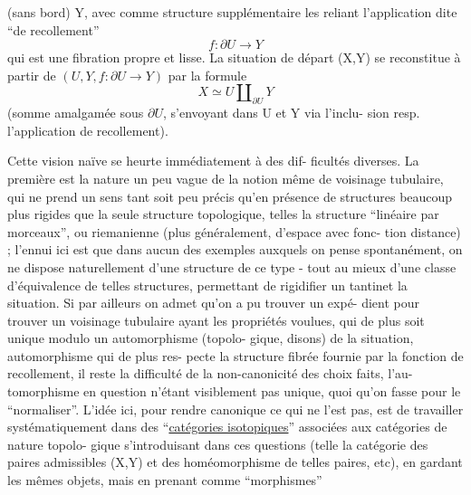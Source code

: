 
(sans bord)  Y, avec comme structure supplémentaire les reliant
l'application dite ``de recollement''
\[ f : \partial U \longrightarrow Y \]
qui est une fibration propre et lisse. La situation de départ
(X,Y)  se reconstitue à partir de  $(U,Y, f : \partial U \longrightarrow Y)$  par la
formule
\[ X \simeq U \amalg_{\partial U} Y \]
(somme amalgamée sous  $\partial U$, s'envoyant dans  U  et  Y  via l'inclu-%
sion resp. l'application de recollement).

Cette vision naïve se heurte immédiatement à des dif-%
ficultés diverses. La première est la nature un peu vague de la
notion même de voisinage tubulaire, qui ne prend un sens tant soit
peu précis qu'en présence de structures beaucoup plus rigides que
la seule structure topologique, telles la structure ``linéaire par
morceaux'', ou riemanienne (plus généralement, d'espace avec fonc-%
tion distance) ; l'ennui ici est que dans aucun des exemples
auxquels on pense spontanément, on ne dispose naturellement d'une
structure de ce type - tout au mieux d'une classe d'équivalence
de telles structures, permettant de rigidifier un tantinet la
situation. Si par ailleurs on admet qu'on a pu trouver un expé-%
dient pour trouver un voisinage tubulaire ayant les propriétés
voulues, qui de plus soit unique modulo un automorphisme (topolo-%
gique, disons) de la situation, automorphisme qui de plus res-%
pecte la structure fibrée fournie par la fonction de recollement,
il reste la difficulté de la non-canonicité des choix faits, l'au-%
tomorphisme en question n'étant visiblement pas unique, quoi qu'on
fasse pour le ``normaliser''. L'idée ici, pour rendre canonique ce
qui ne l'est pas, est de travailler systématiquement dans des
``\uline{catégories isotopiques}'' associées aux catégories de nature topolo-%
gique s'introduisant dans ces questions (telle la catégorie des
paires admissibles  (X,Y)  et des homéomorphisme de telles paires,
etc), en gardant les mêmes objets, mais en prenant comme ``morphismes''

